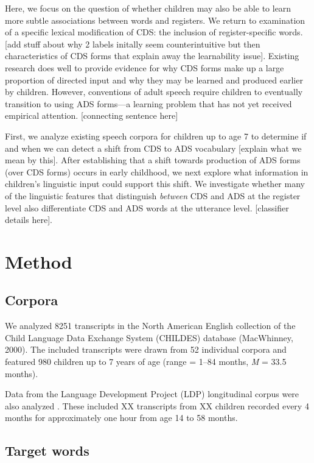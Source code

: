\documentclass[10pt, letterpaper]{article}
\begin{document}
Here, we focus on the question of whether children may also be able to
learn more subtle associations between words and registers. We return to
examination of a specific lexical modification of CDS: the inclusion of
register-specific words. {[}add stuff about why 2 labels initally seem
counterintuitive but then characteristics of CDS forms that explain away
the learnability issue{]}. Existing research does well to provide
evidence for why CDS forms make up a large proportion of directed input
and why they may be learned and produced earlier by children. However,
conventions of adult speech require children to eventually transition to
using ADS forms---a learning problem that has not yet received empirical
attention. {[}connecting sentence here{]}

First, we analyze existing speech corpora for children up to age 7 to
determine if and when we can detect a shift from CDS to ADS vocabulary
{[}explain what we mean by this{]}. After establishing that a shift
towards production of ADS forms (over CDS forms) occurs in early
childhood, we next explore what information in children's linguistic
input could support this shift. We investigate whether many of the
linguistic features that distinguish \emph{between} CDS and ADS at the
register level also differentiate CDS and ADS words at the utterance
level. {[}classifier details here{]}.

\hypertarget{method}{%
\section{Method}\label{method}}

\hypertarget{corpora}{%
\subsection{Corpora}\label{corpora}}

We analyzed 8251 transcripts in the North American English collection of
the Child Language Data Exchange System (CHILDES) database (MacWhinney,
2000). The included transcripts were drawn from 52 individual corpora
and featured 980 children up to 7 years of age (range = 1--84 months,
\emph{M} = 33.5 months).

Data from the Language Development Project (LDP) longitudinal corpus
were also analyzed . These included XX transcripts from XX children
recorded every 4 months for approximately one hour from age 14 to 58
months.

\hypertarget{target-words}{%
\subsection{Target words}\label{target-words}}
\end{document}
